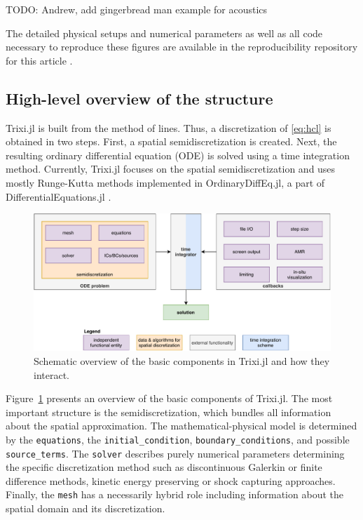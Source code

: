 \documentclass{juliacon}
\newcommand{\trixi}{Trixi.jl\xspace}
\newcommand{\todo}[1]{{\color{red}#1}}
\begin{document}
\todo{TODO: Andrew, add gingerbread man example for acoustics} %

The detailed physical setups and numerical parameters as well as all code
necessary to reproduce these figures are available in the reproducibility
repository for this article \cite{ranocha2021adaptiveRepro}.


\subsection{High-level overview of the structure}

\trixi is built from the method of lines. Thus, a discretization of \eqref{eq:hcl}
is obtained in two steps. First, a spatial semidiscretization is created. Next,
the resulting ordinary differential equation (ODE) is solved using a time
integration method. Currently, \trixi focuses on the spatial semidiscretization
and uses mostly Runge-Kutta methods implemented in OrdinaryDiffEq.jl, a part
of DifferentialEquations.jl \cite{rackauckas2017differentialequations}.

\begin{figure}[htbp]
  \includegraphics[width=\linewidth]{../figures/trixi_global_overview}
  \caption{Schematic overview of the basic components in \trixi and how they
           interact.}
  \label{fig:trixi_global_overview}
\end{figure}

Figure~\ref{fig:trixi_global_overview} presents an overview of the basic
components of \trixi. The most important structure is the semidiscretization,
which bundles all information about the spatial approximation. The mathematical-physical
model is determined by the \lstinline{equations}, the \lstinline{initial_condition},
\lstinline{boundary_conditions}, and possible \lstinline{source_terms}. The
\lstinline{solver} describes purely numerical parameters determining the specific
discretization method such as discontinuous Galerkin or finite difference
methods, kinetic energy preserving or shock capturing approaches. Finally, the
\lstinline{mesh} has a necessarily hybrid role including information about the
spatial domain and its discretization.
\end{document}
